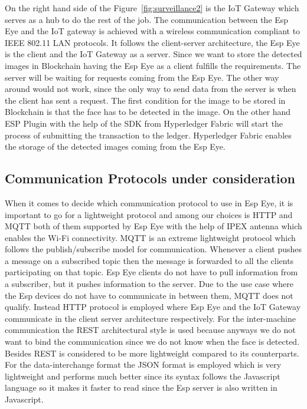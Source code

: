 On the right hand side of the Figure~\ref{fig:surveillance2} is the IoT Gateway which serves as a hub to do the rest of the job. The communication between the Esp Eye and the IoT gateway is achieved with a wireless communication compliant to IEEE 802.11 LAN protocols. It follows the client-server architecture, the Esp Eye is the client and the IoT Gateway as a server. Since we want to store the detected images in Blockchain having the Esp Eye as a client fulfills the requirements. The server will be waiting for requests coming from the Esp Eye. The other way around would not work, since the only way to send data from the server is when the client has sent a request. The first condition for the image to be stored in Blockchain is that the face has to be detected in the image. On the other hand ESP Plugin with the help of the SDK from Hyperledger Fabric will start the process of submitting the transaction to the ledger. Hyperledger Fabric enables the storage of the detected images coming from the Esp Eye.   

\subsection{Communication Protocols under consideration}
When it comes to decide which communication protocol to use in Esp Eye, it is important to go for a lightweight protocol and among our choices is HTTP and MQTT both of them supported by Esp Eye with the help of IPEX antenna which enables the Wi-Fi connectivity. MQTT is an extreme lightweight protocol which follows the publish/subscribe model for communication. Whenever a client pushes a message on a subscribed topic then the message is forwarded to all the clients participating on that topic. Esp Eye clients do not have to pull information from a subscriber, but it pushes information to the server. Due to the use case where the Esp devices do not have to communicate in between them, MQTT does not qualify. 
Instead HTTP protocol is employed where Esp Eye and the IoT Gateway communicate in the client server architecture respectively. For the inter-machine communication the REST architectural style is used because anyways we do not want to bind the communication since we do not know when the face is detected. Besides REST is considered to be more lightweight compared to its counterparts. For the data-interchange format the JSON format is employed which is very lightweight and performs much better since its syntax follows the Javascript language so it makes it faster to read since the Esp server is also written in Javascript.  
